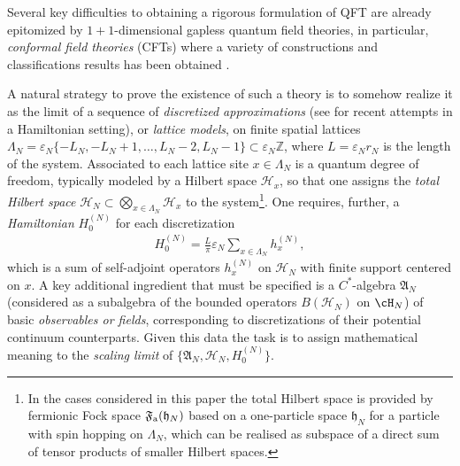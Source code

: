 \documentclass[a4paper, 11pt]{article}
\newcommand{\ua}{\textup a}
\newcommand{\fF}{\mathfrak{F}}\newcommand{\cF}{\mathcal{F}}\newcommand{\dF}{\mathds{F}}\newcommand{\sF}{\mathscr{F}}
\DeclareMathOperator{\1}{\mathds{1}}
\begin{document}
Several key difficulties to obtaining a rigorous formulation of QFT are already epitomized by $1+1$-dimensional gapless quantum field theories, in particular, \emph{conformal field theories} (CFTs) where a variety of constructions and classifications results has been obtained \cite{BelavinInfiniteConformalSymmetry, DiFrancescoCFTBook, EvansQuantumSymmetriesOn, WassermannOperatorAlgebrasAnd, BrunettiModularStructureAnd, GabbianiOperatorAlgebrasAnd, BuchholzTheCurrentAlgebra, KawahigashiClassificationOfLocal, CarpiFromVertexOperator}. 

A natural strategy to prove the existence of such a theory is to somehow realize it as the limit of a sequence of \emph{discretized approximations} (see \cite{JonesSomeUnitaryRepresentations, JonesANoGo, JonesScaleInvariantTransfer, BrothierConstructionsOfConformal, KlieschContinuumLimitsOf, OsborneQuantumFieldsFor} for recent attempts in a Hamiltonian setting), or \emph{lattice models}, on finite spatial lattices $\Lambda_{N} = \varepsilon_{N}\{-L_{N}, -L_{N} +1, \ldots, L_{N}-2, L_{N}-1\}\subset\varepsilon_{N}  \mathbb{Z}$, where $L=\varepsilon_N r_N$ is the length of the system. Associated to each lattice site $x\in \Lambda_N$ is a quantum degree of freedom, typically modeled by a Hilbert space $\mathcal{H}_x$, so that one assigns the \emph{total Hilbert space} $\mathcal{H}_{N} \subset \bigotimes_{x\in \Lambda_{N}} \mathcal{H}_x$ to the system\footnote{In the cases considered in this paper the total Hilbert space is provided by fermionic Fock space $\fF_{\ua}(\mathfrak{h}_{N})$ based on a one-particle space $\mathfrak{h}_{N}$ for a particle with spin hopping on $\Lambda_N$, which can be realised as subspace of a direct sum of tensor products of smaller Hilbert spaces.}. One requires, further, a \emph{Hamiltonian} $H_{0}^{(N)}$ for each discretization
\begin{align*}
H^{(N)}_0 = \tfrac{L}{\pi}\varepsilon_N\sum_{x\in\Lambda_N} h_x^{(N)},
\end{align*}
which is a sum of self-adjoint operators $h_x^{(N)}$ on $\mathcal{H}_N$ with finite support centered on $x$. A key additional ingredient that must be specified is a $C^{*}$-algebra $\mathfrak{A}_N$ (considered as a subalgebra of the bounded operators $B(\mathcal{H}_N)$ on $\cH_{N}$) of basic \emph{observables or fields}, corresponding to discretizations of their potential continuum counterparts. Given this data the task is to assign mathematical meaning to the \emph{scaling limit} of $\{\mathfrak{A}_N, \mathcal{H}_N, H^{(N)}_0\}$. 
\end{document}
